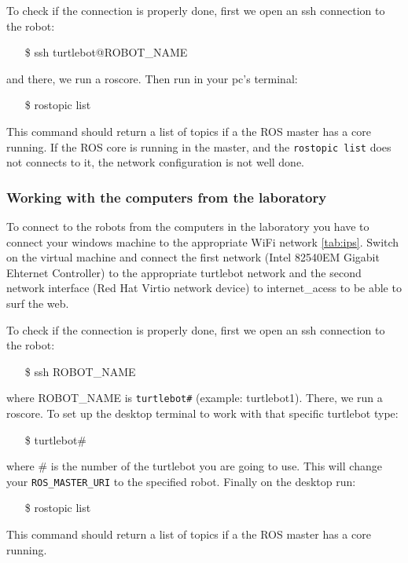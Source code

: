 \documentclass[a4paper,10pt]{article}
\begin{document}
To check if the connection is properly done, first we open an ssh connection to the robot:
\begin{shaded}
	\begin{itemize}
		\item[\$] ssh turtlebot@ROBOT\_NAME
	\end{itemize}
\end{shaded}
and there, we run a roscore. Then run in your pc's terminal:
\begin{shaded}
	\begin{itemize}
		\item[\$] rostopic list
	\end{itemize}
\end{shaded}
This command should return a list of topics if a the ROS master has a core running. If the ROS core is running in the master, and the \texttt{rostopic list} does not connects to it, the network configuration is not well done.

\subsubsection{Working with the computers from the laboratory}
To connect to the robots from the computers in the laboratory you have to connect your windows machine to the appropriate WiFi network \ref{tab:ips}. Switch on the virtual machine and connect the first network (Intel 82540EM Gigabit Ehternet Controller) to the appropriate turtlebot network and the second network interface (Red Hat Virtio network device) to internet\_acess to be able to surf the web.

To check if the connection is properly done, first we open an ssh connection to the robot:
\begin{shaded}
	\begin{itemize}
		\item[\$] ssh ROBOT\_NAME
	\end{itemize}
\end{shaded}
where ROBOT\_NAME is \texttt{turtlebot\#} (example: turtlebot1). There, we run a roscore. To set up the desktop terminal to work with that specific turtlebot type:
\begin{shaded}
	\begin{itemize}
		\item[\$] turtlebot\#
	\end{itemize}
\end{shaded}
where \# is the number of the turtlebot you are going to use. This will change your \texttt{ROS\_MASTER\_URI} to the specified robot. Finally on the desktop run:
\begin{shaded}
	\begin{itemize}
		\item[\$] rostopic list
	\end{itemize}
\end{shaded}
This command should return a list of topics if a the ROS master has a core running.
\end{document}
